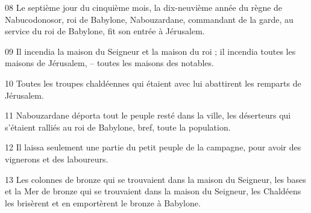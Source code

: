
08 Le septième jour du cinquième mois, la dix-neuvième année du règne de Nabucodonosor, roi de Babylone, Nabouzardane, commandant de la garde, au service du roi de Babylone, fit son entrée à Jérusalem.

09 Il incendia la maison du Seigneur et la maison du roi ; il incendia toutes les maisons de Jérusalem, – toutes les maisons des notables.

10 Toutes les troupes chaldéennes qui étaient avec lui abattirent les remparts de Jérusalem.

11 Nabouzardane déporta tout le peuple resté dans la ville, les déserteurs qui s’étaient ralliés au roi de Babylone, bref, toute la population.

12 Il laissa seulement une partie du petit peuple de la campagne, pour avoir des vignerons et des laboureurs.

13 Les colonnes de bronze qui se trouvaient dans la maison du Seigneur, les bases et la Mer de bronze qui se trouvaient dans la maison du Seigneur, les Chaldéens les brisèrent et en emportèrent le bronze à Babylone.